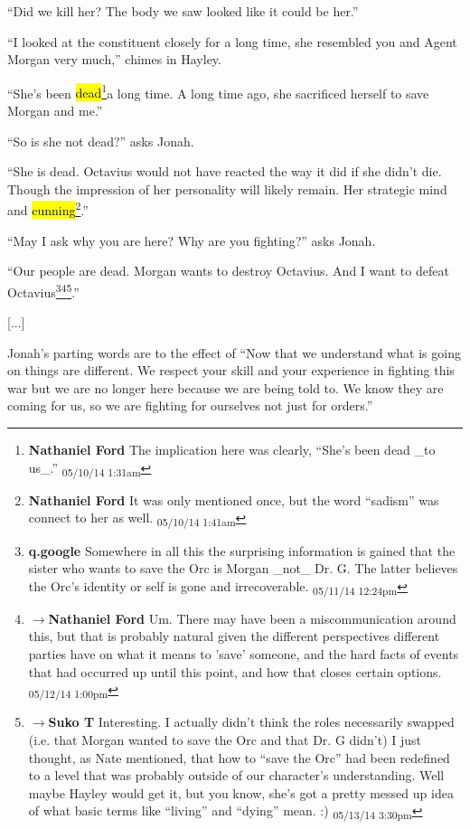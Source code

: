``Did we kill her?  The body we saw looked like it could be her.''

``I looked at the constituent closely for a long time, she resembled you and Agent Morgan very much,'' chimes in Hayley.

``She's been \hl{dead}\footnote{\textbf{Nathaniel Ford }The implication here was clearly, ``She's been dead \_to us\_.'' \textsubscript{05/10/14 1:31am}}a long time.  A long time ago, she sacrificed herself to save Morgan and me.''

``So is she not dead?'' asks Jonah.

``She is dead.  Octavius would not have reacted the way it did if she didn't die. Though the impression of her personality will likely remain.  Her strategic mind and \hl{cunning}\footnote{\textbf{Nathaniel Ford }It was only mentioned once, but the word ``sadism'' was connect to her as well. \textsubscript{05/10/14 1:41am}}.''

``May I ask why you are here? Why are you fighting?'' asks Jonah.

``Our people are dead.  Morgan wants to destroy Octavius. And I want to defeat Octavius\footnote{\textbf{q.google }Somewhere in all this the surprising information is gained that the sister who wants to save the Orc is Morgan \_not\_ Dr. G.  The latter believes the Orc's identity or self is gone and irrecoverable. \textsubscript{05/11/14 12:24pm}}\footnote{$\rightarrow$\textbf{Nathaniel Ford }Um. There may have been a miscommunication around this, but that is probably natural given the different perspectives different parties have on what it means to 'save' someone, and the hard facts of events that had occurred up until this point, and how that closes certain options. \textsubscript{05/12/14 1:00pm}}\footnote{$\rightarrow$\textbf{Suko T }Interesting.  I actually didn't think the roles necessarily swapped (i.e. that Morgan wanted to save the Orc and that Dr. G didn't) I just thought, as Nate mentioned, that how to ``save the Orc'' had been redefined to a level that was probably outside of our character's understanding.  Well maybe Hayley would get it, but you know, she's got a pretty messed up idea of what basic terms like ``living'' and ``dying'' mean. :) \textsubscript{05/13/14 3:30pm}}.''

{[}...{]}

Jonah's parting words are to the effect of ``Now that we understand what is going on things are different.  We respect your skill and your experience in fighting this war but we are no longer here because we are being told to. We know they are coming for us, so we are fighting for ourselves not just for orders.''

